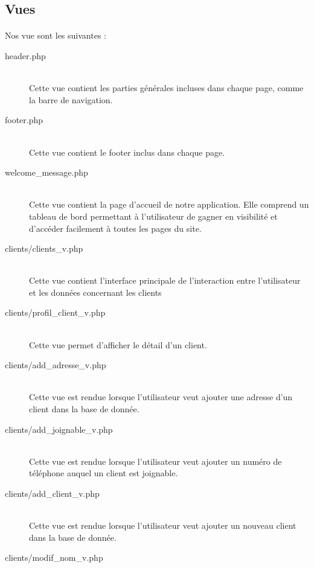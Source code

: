     \subsection{Vues}
    \paragraph{}
        Nos vue sont les suivantes :
        \begin{description}
            \item[header.php]\hfill \\
                Cette vue contient les parties générales incluses dans chaque
                page, comme la barre de navigation.
            \item[footer.php]\hfill \\
                Cette vue contient le footer inclus dans chaque page.
            \item[welcome\_message.php]\hfill \\
                Cette vue contient la page d'accueil de notre application.
                Elle comprend un tableau de bord permettant à l'utilisateur
                de gagner en visibilité et d'accéder facilement à toutes les
                pages du site.
            \item[clients/clients\_v.php]\hfill \\
                Cette vue contient l'interface principale de l'interaction
                entre l'utilisateur et les données concernant les clients
            \item[clients/profil\_client\_v.php]\hfill \\
                Cette vue permet d'afficher le détail d'un client.
            \item[clients/add\_adresse\_v.php]\hfill \\
                Cette vue est rendue lorsque l'utilisateur veut ajouter une
                adresse d'un client dans la base de donnée.
            \item[clients/add\_joignable\_v.php]\hfill \\
                Cette vue est rendue lorsque l'utilisateur veut ajouter un
                numéro de téléphone auquel un client est joignable.
            \item[clients/add\_client\_v.php]\hfill \\
                Cette vue est rendue lorsque l'utilisateur veut ajouter un
                nouveau client dans la base de donnée.
            \item[clients/modif\_nom\_v.php]\hfill \\

\end{description}
